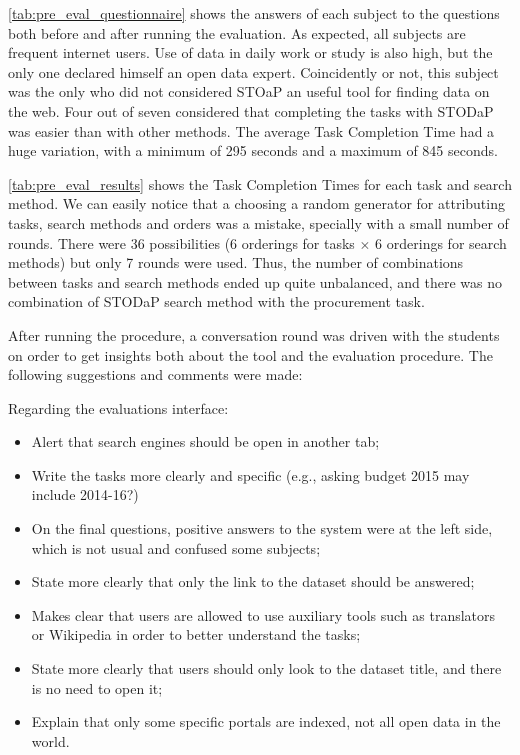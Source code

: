 \autoref{tab:pre_eval_questionnaire} shows the answers of each subject to the questions both before and after running the evaluation.
As expected, all subjects are frequent internet users.
Use of data in daily work or study is also high, but the only one declared himself an open data expert.
Coincidently or not, this subject was the only who did not considered STOaP an useful tool for finding data on the web.
Four out of seven considered that completing the tasks with STODaP was easier than with other methods.
The average Task Completion Time had a huge variation, with a minimum of 295 seconds and a maximum of 845 seconds.

\autoref{tab:pre_eval_results} shows the Task Completion Times for each task and search method.
We can easily notice that a choosing a random generator for attributing tasks, search methods and orders was a mistake, specially with a small number of rounds.
There were 36 possibilities (6 orderings for tasks $\times$ 6 orderings for search methods) but only 7 rounds were used.
Thus, the number of combinations between tasks and search methods ended up quite unbalanced, and there was no combination of STODaP search method with the procurement task.

After running the procedure, a conversation round was driven with the students on order to get insights both about the tool and the evaluation procedure.
The following suggestions and comments were made:

Regarding the evaluations interface:

\begin{itemize}
	\item Alert that search engines should be open in another tab;
	\item Write the tasks more clearly and specific (e.g., asking budget 2015 may include 2014-16?)
	\item On the final questions, positive answers to the system were at the left side, which is not usual and confused some subjects;
	\item State more clearly that only the link to the dataset should be answered;
	\item Makes clear that users are allowed to use auxiliary tools such as translators or Wikipedia in order to better understand the tasks;
	\item State more clearly that users should only look to the dataset title, and there is no need to open it;
	\item Explain that only some specific portals are indexed, not all open data in the world.
\end{itemize}

